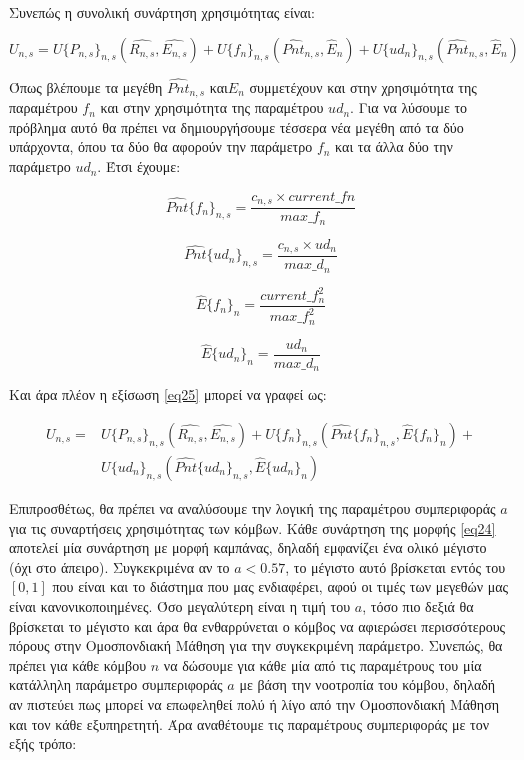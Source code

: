 Συνεπώς η συνολική συνάρτηση χρησιμότητας είναι:

\vspace{-0.6cm}

\begin{equation}
U_{n,s} =  U\{P_{n,s}\}_{n,s}(\hat{R_{n,s}}, \hat{E_{n,s}}) + U\{f_n\}_{n,s}(\hat{Pnt}_{n,s}, \hat{E}_n) + U\{ud_n\}_{n,s}(\hat{Pnt}_{n,s}, \hat{E}_n)
\label{eq25}
\end{equation}

\vspace{-3pt}

\noindent
Όπως βλέπουμε τα μεγέθη $\hat{Pnt}_{n,s}$ και$\hat{E}_n$ συμμετέχουν και στην χρησιμότητα της παραμέτρου $f_n$ και στην χρησιμότητα της παραμέτρου $ud_n$. Για να λύσουμε το πρόβλημα αυτό θα πρέπει να δημιουργήσουμε τέσσερα νέα μεγέθη από τα δύο υπάρχοντα, όπου τα δύο θα αφορούν την παράμετρο $f_n$ και τα άλλα δύο την παράμετρο $ud_n$. Έτσι έχουμε:

\[\hat{Pnt}\{f_n\}_{n,s}=\frac{c_{n,s}\times current\_fn}{max\_f_n}\]

\[\hat{Pnt}\{ud_n\}_{n,s}=\frac{c_{n,s}\times ud_n}{max\_d_n}\]

\[\hat{E}\{f_n\}_n = \frac{current\_f_n^2}{max\_f_n^2}\]

\[\hat{E}\{ud_n\}_n = \frac{ud_n}{max\_d_n}\]

\noindent Και άρα πλέον η εξίσωση \ref{eq25} μπορεί να γραφεί ως:

\vspace{-0.6cm}

\begin{equation}
\begin{split}
    U_{n,s} =& U\{P_{n,s}\}_{n,s}(\hat{R_{n,s}}, \hat{E_{n,s}}) + U\{f_n\}_{n,s}(\hat{Pnt}\{f_n\}_{n,s}, \hat{E}\{f_n\}_n) +\\
    & U\{ud_n\}_{n,s}(\hat{Pnt}\{ud_n\}_{n,s}, \hat{E}\{ud_n\}_n)
\end{split}
\label{eq26}
\end{equation}

\vspace{-3pt}

Επιπροσθέτως, θα πρέπει να αναλύσουμε την λογική της παραμέτρου συμπεριφοράς $a$ για τις συναρτήσεις χρησιμότητας των κόμβων. Κάθε συνάρτηση της μορφής \ref{eq24} αποτελεί μία συνάρτηση με μορφή καμπάνας, δηλαδή εμφανίζει ένα ολικό μέγιστο (όχι στο άπειρο). Συγκεκριμένα αν το $a < 0.57$, το μέγιστο αυτό βρίσκεται εντός του $[0,1]$ που είναι και το διάστημα που μας ενδιαφέρει, αφού οι τιμές των μεγεθών μας είναι κανονικοποιημένες. Όσο μεγαλύτερη είναι η τιμή του $a$, τόσο πιο δεξιά θα βρίσκεται το μέγιστο και άρα θα ενθαρρύνεται ο κόμβος να αφιερώσει περισσότερους πόρους στην Ομοσπονδιακή Μάθηση για την συγκεκριμένη παράμετρο. Συνεπώς, θα πρέπει για κάθε κόμβου $n$ να δώσουμε για κάθε μία από τις παραμέτρους του μία κατάλληλη παράμετρο συμπεριφοράς $a$ με βάση την νοοτροπία του κόμβου, δηλαδή αν πιστεύει πως μπορεί να επωφεληθεί πολύ ή λίγο από την Ομοσπονδιακή Μάθηση και τον κάθε εξυπηρετητή. Άρα αναθέτουμε τις παραμέτρους συμπεριφοράς με τον εξής τρόπο:

